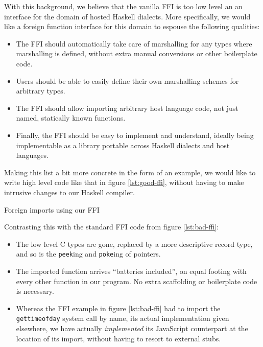 \documentclass[preprint]{sigplanconf}
\begin{document}
With this background, we believe that the vanilla FFI is too low level an
an interface for the domain of hosted Haskell dialects.
More specifically, we would like a foreign function interface for this domain
to espouse the following qualities:

\begin{itemize}
\item
  The FFI should automatically take care of marshalling for any types where
  marshalling is defined, without extra manual conversions or other
  boilerplate code.
\item
  Users should be able to easily define their own marshalling schemes for
  arbitrary types.
\item
  The FFI should allow importing arbitrary host language code, not just named,
  statically known functions.
\item
  Finally, the FFI should be easy to implement and understand, ideally being
  implementable as a library portable across Haskell dialects and host
  languages.
\end{itemize}

Making this list a bit more concrete in the form of an example, we would like
to write high level code like that in figure \ref{lst:good-ffi}, without
having to make intrusive changes to our Haskell compiler.

\begin{listingfloat}
\caption{Foreign imports using our FFI}
\label{lst:good-ffi}
\end{listingfloat}

Contrasting this with the standard FFI code from figure \ref{lst:bad-ffi}:

\begin{itemize}
\item
  The low level C types are gone, replaced by a more descriptive record type,
  and so is the \lstinline!peek!ing and \lstinline!poke!ing of pointers.
\item
  The imported function arrives ``batteries included'', on equal footing with
  every other function in our program. No extra scaffolding or boilerplate
  code is necessary.
\item
  Whereas the FFI example in figure \ref{lst:bad-ffi} had to import the
  \lstinline!gettimeofday! system call by name, its actual implementation
  given elsewhere, we have actually \emph{implemented} its JavaScript
  counterpart at the location of its import, without having to resort to
  external stubs.
\end{itemize}
\end{document}

